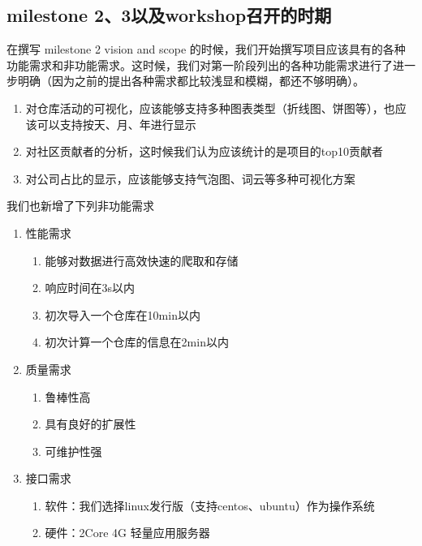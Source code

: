 \documentclass[a4paper,20pt]{article}
\begin{document}
\subsection{milestone 2、3以及workshop召开的时期}
在撰写 milestone 2 vision and scope 的时候，我们开始撰写项目应该具有的各种功能需求和非功能需求。这时候，我们对第一阶段列出的各种功能需求进行了进一步明确（因为之前的提出各种需求都比较浅显和模糊，都还不够明确）。
\begin{enumerate}
    \item 对仓库活动的可视化，应该能够支持多种图表类型（折线图、饼图等），也应该可以支持按天、月、年进行显示
    \item 对社区贡献者的分析，这时候我们认为应该统计的是项目的top10贡献者
    \item 对公司占比的显示，应该能够支持气泡图、词云等多种可视化方案
\end{enumerate}
\tab 我们也新增了下列非功能需求
\begin{enumerate}
    \item 性能需求
    \begin{enumerate}
        \item 能够对数据进行高效快速的爬取和存储
        \item 响应时间在3s以内
        \item 初次导入一个仓库在10min以内
        \item 初次计算一个仓库的信息在2min以内
    \end{enumerate} 
    \item 质量需求
    \begin{enumerate}
        \item 鲁棒性高
        \item 具有良好的扩展性
        \item 可维护性强
    \end{enumerate}
    \item 接口需求
    \begin{enumerate}
        \item 软件：我们选择linux发行版（支持centos、ubuntu）作为操作系统
        \item 硬件：2Core 4G 轻量应用服务器
    \end{enumerate}
\end{enumerate}
\end{document}

